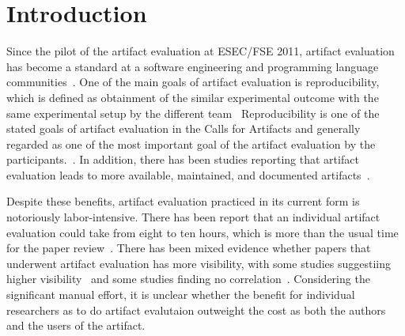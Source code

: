 \section{Introduction}
\label{s:introduction}

Since the pilot of the artifact evaluation at ESEC/FSE 2011, artifact evaluation has become a standard at a software engineering and programming language communities~\cite{DBLP:journals/cacm/KrishnamurthiV15}.
One of the main goals of artifact evaluation is reproducibility, which is defined as obtainment of the similar experimental outcome with the same experimental setup by the different team~\cite{acm-artifact-badging-v1_1}
Reproducibility is one of the stated goals of artifact evaluation in the Calls for Artifacts and generally regarded as one of the most important goal of the artifact evaluation by the participants.~\cite{DBLP:conf/sigsoft/Hermann0S20}.
In addition, there has been studies reporting that artifact evaluation leads to more available, maintained, and documented artifacts~\cite{DBLP:conf/se/0001T0C0H024}.

Despite these benefits, artifact evaluation practiced in its current form is notoriously labor-intensive.
There has been report that an individual artifact evaluation could take from eight to ten hours, which is more than the usual time for the paper review~\cite{DBLP:journals/ieeesp/Hermann22}.
There has been mixed evidence whether papers that underwent artifact evaluation has more visibility, with some studies suggestiing higher visibility~\cite{DBLP:journals/ese/HeumullerNKO20} and some studies finding no correlation~\cite{DBLP:conf/se/0001T0C0H024}.
Considering the significant manual effort, it is unclear whether the benefit for individual researchers as to do artifact evalutaion outweight the cost as both the authors and the users of the artifact.


